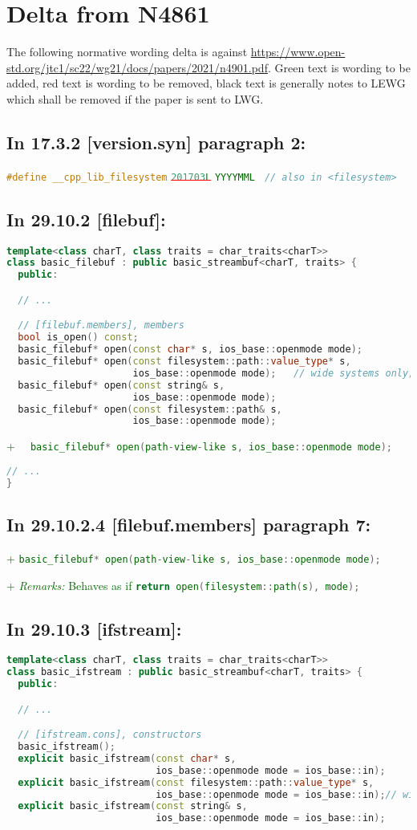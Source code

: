 \documentclass[11pt]{article}
\newcommand{\code}[2][cpp]{\lstinline[language=#1,basicstyle=\small\ttfamily]{#2}}
\newcommand{\desc}[1]{\textit{#1}}
\newcommand{\remarks}{\desc{Remarks: }}
\newcommand{\tsrefp}[3]{\subsection*{In #2 \textbf{[#1]} paragraph #3:}}
\newcommand{\tsref}[2]{\subsection*{In #2 \textbf{[#1]}:}}
\newcommand{\tsreplace}[3]{\textcolor{red}{\sout{#1}}#2\textcolor{darkgreen}{#3}}
\begin{document}
\section{Delta from N4861}

The following normative wording delta is against \url{https://www.open-std.org/jtc1/sc22/wg21/docs/papers/2021/n4901.pdf}. Green text is wording to be added, red text is wording to be removed, black text is generally notes to LEWG which shall be removed if the paper is sent to LWG.

\tsrefp{version.syn}{17.3.2}{2}

\code{#define __cpp_lib_filesystem}
\tsreplace{\code{201703L}}{ }{\code{YYYYMML}}
\code{ // also in <filesystem>}

\tsref{filebuf}{29.10.2}

\begin{lstlisting}[language=cpp]
template<class charT, class traits = char_traits<charT>>
class basic_filebuf : public basic_streambuf<charT, traits> {
  public:

  // ...

  // [filebuf.members], members
  bool is_open() const;
  basic_filebuf* open(const char* s, ios_base::openmode mode);
  basic_filebuf* open(const filesystem::path::value_type* s,
                      ios_base::openmode mode);   // wide systems only; see [fstream.syn]
  basic_filebuf* open(const string& s,
                      ios_base::openmode mode);
  basic_filebuf* open(const filesystem::path& s,
                      ios_base::openmode mode);
\end{lstlisting}

\tsreplace{}{}{+ \code{  basic_filebuf* open(path-view-like s, ios_base::openmode mode);}}

\begin{lstlisting}[language=cpp]
  // ...
}
\end{lstlisting}

\tsrefp{filebuf.members}{29.10.2.4}{7}

\tsreplace{}{}{+ \code{basic_filebuf* open(path-view-like s, ios_base::openmode mode);}}

\tsreplace{}{}{+ \remarks Behaves as if \code{return open(filesystem::path(s), mode);}}

\tsref{ifstream}{29.10.3}

\begin{lstlisting}[language=cpp]
template<class charT, class traits = char_traits<charT>>
class basic_ifstream : public basic_streambuf<charT, traits> {
  public:

  // ...

  // [ifstream.cons], constructors
  basic_ifstream();
  explicit basic_ifstream(const char* s,
                          ios_base::openmode mode = ios_base::in);
  explicit basic_ifstream(const filesystem::path::value_type* s,
                          ios_base::openmode mode = ios_base::in);// wide systems only; see [fstream.syn]
  explicit basic_ifstream(const string& s,
                          ios_base::openmode mode = ios_base::in);
\end{lstlisting}
\end{document}
